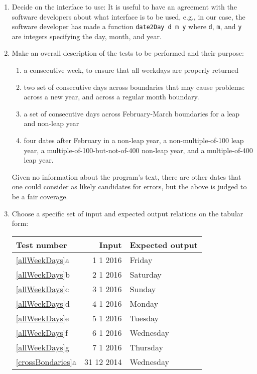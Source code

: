 \documentclass[fsharpnotes.tex]{subfiles}
\begin{document}
\begin{enumerate}
\item Decide on the interface to use: It is useful to have an agreement with the software developers about what interface is to be used, e.g., in our case, the software developer has made a function \lstinline!date2Day d m y! where \lstinline!d!, \lstinline!m!, and \lstinline!y! are integers specifying the day, month, and year.
\item Make an overall description of the tests to be performed and their purpose:
  \begin{enumerate}[label=\arabic*]
  \item\label{allWeekDays} a consecutive week, to ensure that all weekdays are properly returned
  \item\label{crossBondaries} two set of consecutive days across boundaries that may cause problems: across a new year, and across a regular month boundary.
  \item\label{februaryBoundaries} a set of consecutive days across February-March boundaries for a leap and non-leap year
  \item\label{leapYears} four dates after February in a non-leap year, a non-multiple-of-100 leap year, a multiple-of-100-but-not-of-400 non-leap year, and a multiple-of-400 leap year.
  \end{enumerate}
  Given no information about the program's text, there are other dates that one could consider as likely candidates for errors, but the above is judged to be a fair coverage.
\item Choose a specific set of input and expected output relations on the tabular form:
\begin{center}
  \begin{tabular}{|l|r|l|}
    \hline
    \rowcolor{headerRowColor} Test number&Input& Expected output\\
    \hline
    \ref{allWeekDays}a&1 1 2016&Friday\\
    \ref{allWeekDays}b&2 1 2016&Saturday\\
    \ref{allWeekDays}c&3 1 2016&Sunday\\
    \ref{allWeekDays}d&4 1 2016&Monday\\
    \ref{allWeekDays}e&5 1 2016&Tuesday\\
    \ref{allWeekDays}f&6 1 2016&Wednesday\\
    \ref{allWeekDays}g&7 1 2016&Thursday\\
    \hline
    \ref{crossBondaries}a&31 12 2014&Wednesday\\

\end{tabular}
\end{center}
\end{enumerate}
\end{document}
